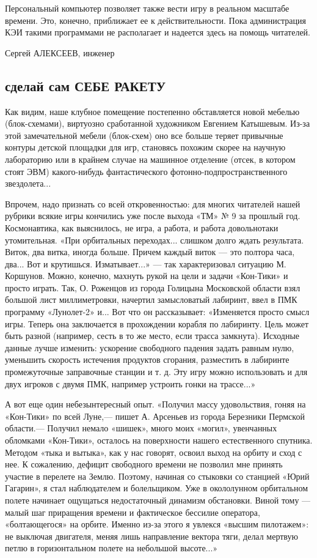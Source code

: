 \documentclass[11pt,a4paper,oneside]{article}
\begin{document}
Персональный компьютер позволяет также вести игру в реальном масштабе времени. Это, конечно, приближает ее к действительности. Пока администрация КЭИ такими программами не располагает и надеется здесь на помощь читателей.

Сергей АЛЕКСЕЕВ, инженер

\subsection{сделай сам СЕБЕ РАКЕТУ}
Как видим, наше клубное помещение постепенно обставляется новой мебелью (блок-схемами), виртуозно сработанной художником Евгением Катышевым. Из-за этой замечательной мебели (блок-схем) оно все больше теряет привычные контуры детской площадки для игр, становясь похожим скорее на научную лабораторию или в крайнем случае на машинное отделение (отсек, в котором стоят ЭВМ) какого-нибудь фантастического фотонно-подпространственного звездолета...

Впрочем, надо признать со всей откровенностью: для многих читателей нашей рубрики всякие игры кончились уже после выхода «ТМ» № 9 за прошлый год. Космонавтика, как выяснилось, не игра, а работа, и работа довольнотаки утомительная. «При орбитальных переходах... слишком долго ждать результата. Виток, два витка, иногда больше. Причем каждый виток — это полтора часа, два... Вот и крутишься. Изматывает...» — так характеризовал ситуацию М. Коршунов. Можно, конечно, махнуть рукой на цели и задачи «Кон-Тики» и просто играть. Так, О. Роженцов из города Голицына Московской области взял большой лист миллиметровки, начертил замысловатый лабиринт, ввел в ПМК программу «Лунолет-2» и... Вот что он рассказывает: «Изменяется просто смысл игры. Теперь она заключается в прохождении корабля по лабиринту. Цель может быть разной (например, сесть в то же место, если трасса замкнута). Исходные данные лучше изменить: ускорение свободного падения задать равным нулю, уменьшить скорость истечения продуктов сгорания, разместить в лабиринте промежуточные заправочные станции и т. д. Эту игру можно использовать и для двух игроков с двумя ПМК, например устроить гонки на трассе...»

А вот еще один небезынтересный опыт. «Получил массу удовольствия, гоняя на «Кон-Тики» по всей Луне,— пишет А. Арсеньев из города Березники Пермской области.— Получил немало «шишек», много моих «могил», увенчанных обломками «Кон-Тики», осталось на поверхности нашего естественного спутника. Методом «тыка и вытыка», как у нас говорят, освоил выход на орбиту и сход с нее. К сожалению, дефицит свободного времени не позволил мне принять участие в перелете на Землю. Поэтому, начиная со стыковки со станцией «Юрий Гагарин», я стал наблюдателем и болельщиком. Уже в окололунном орбитальном полете начинает ощущаться недостаточный динамизм обстановки. Виной тому — малый шаг приращения времени и фактическое бессилие оператора, «болтающегося» на орбите. Именно из-за этого я увлекся «высшим пилотажем»: не выключая двигателя, меняя лишь направление вектора тяги, делал мертвую петлю в горизонтальном полете на небольшой высоте...»
\end{document}
